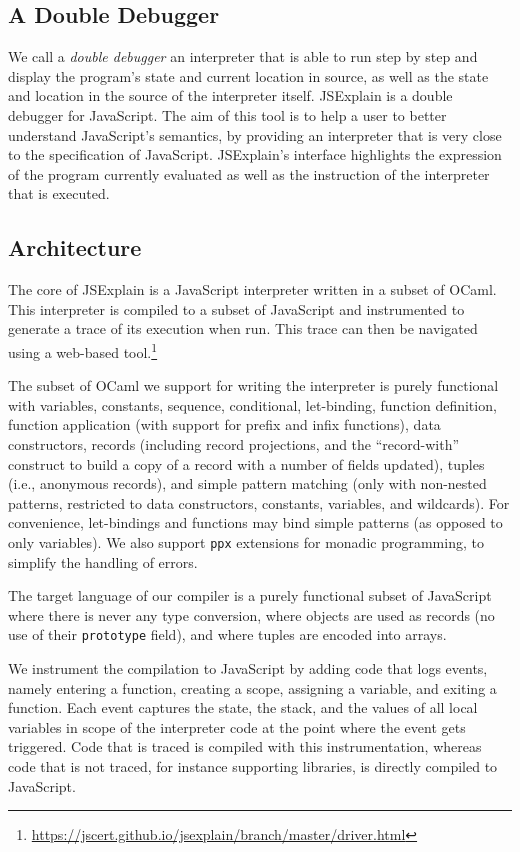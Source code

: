 \documentclass[twocolumn,a4paper]{article} \usepackage[utf8]{inputenc}
\begin{document}
\subsection{A Double Debugger}
\label{subsec:double-debugger}

We call a \emph{double debugger} an interpreter that is able to run step by step
and display the program's state and current location in source, as well as the
state and location in the source of the interpreter itself. JSExplain is a
double debugger for JavaScript. The aim of this tool is to help a user to better
understand JavaScript's semantics, by providing an interpreter that is very
close to the specification of JavaScript. JSExplain's interface highlights the
expression of the program currently evaluated as well as the instruction of the
interpreter that is executed.

\subsection{Architecture}

The core of JSExplain is a JavaScript interpreter written in a subset of OCaml.
This interpreter is compiled to a subset of JavaScript and instrumented to
generate a trace of its execution when run. This trace can then be navigated
using a web-based
tool.\footnote{\url{https://jscert.github.io/jsexplain/branch/master/driver.html}}

The subset of OCaml we support for writing the interpreter is purely functional
with variables, constants, sequence, conditional, let-binding, function
definition, function application (with support for prefix and infix functions),
data constructors, records (including record projections, and the
``record-with'' construct to build a copy of a record with a number of fields
updated), tuples (i.e., anonymous records), and simple pattern matching (only
with non-nested patterns, restricted to data constructors, constants, variables,
and wildcards). For convenience, let-bindings and functions may bind simple
patterns (as opposed to only variables). We also support \texttt{ppx} extensions
for monadic programming, to simplify the handling of errors.

The target language of our compiler is a purely functional subset of JavaScript
where there is never any type conversion, where objects are used as records (no
use of their \texttt{prototype} field), and where tuples are encoded into
arrays.

We instrument the compilation to JavaScript by adding code that logs events,
namely entering a function, creating a scope, assigning a variable, and exiting
a function. Each event captures the state, the stack, and the values of all
local variables in scope of the interpreter code at the point where the event
gets triggered. Code that is traced is compiled with this instrumentation,
whereas code that is not traced, for instance supporting libraries, is directly
compiled to JavaScript.
\end{document}
